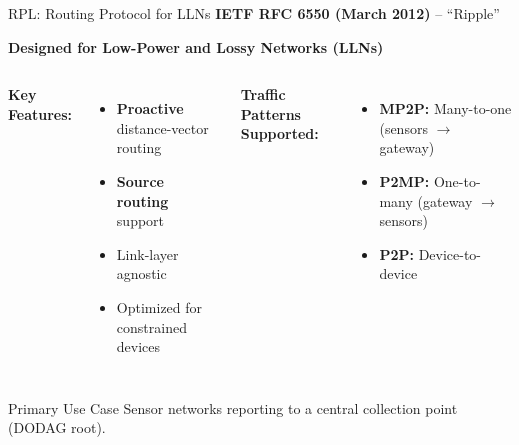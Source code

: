 \documentclass[aspectratio=169,11pt]{beamer}
\begin{document}
\begin{frame}{RPL: Routing Protocol for LLNs}
    \textbf{IETF RFC 6550 (March 2012)} -- ``Ripple''
    
    \vspace{0.3cm}
    \textbf{Designed for Low-Power and Lossy Networks (LLNs)}
    
    \vspace{0.3cm}
    \begin{columns}
        \textbf{Key Features:}
        \begin{itemize}
            \item \textbf{Proactive} distance-vector routing
            \item \textbf{Source routing} support
            \item Link-layer agnostic
            \item Optimized for constrained devices
        \end{itemize}
        
        \textbf{Traffic Patterns Supported:}
        \begin{itemize}
            \item \textbf{MP2P:} Many-to-one (sensors $\rightarrow$ gateway)
            \item \textbf{P2MP:} One-to-many (gateway $\rightarrow$ sensors)
            \item \textbf{P2P:} Device-to-device
        \end{itemize}
    \end{columns}
    
    \vspace{0.3cm}
    \begin{exampleblock}{Primary Use Case}
        Sensor networks reporting to a central collection point (DODAG root).
    \end{exampleblock}
\end{frame}
\end{document}
